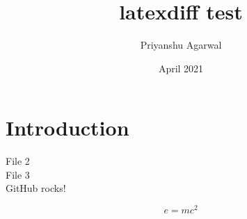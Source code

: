 \documentclass{article}
\title{latexdiff test}
\author{Priyanshu Agarwal}
\date{April 2021}
\begin{document}
\maketitle

\section{Introduction}

File 2
\\File 3
\\GitHub rocks!

\begin{equation}
    e = mc^2
\end{equation}
\end{document}
